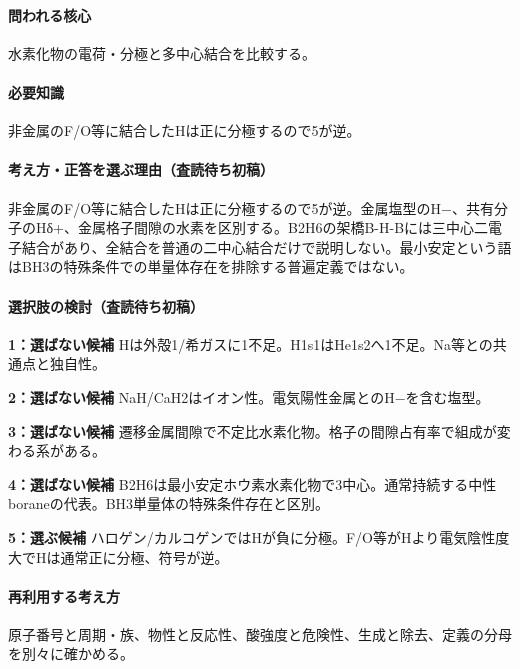\paragraph{問われる核心} 水素化物の電荷・分極と多中心結合を比較する。

\paragraph{必要知識} 非金属のF/O等に結合したHは正に分極するので5が逆。

\paragraph{考え方・正答を選ぶ理由（査読待ち初稿）} 非金属のF/O等に結合したHは正に分極するので5が逆。金属塩型のH−、共有分子のHδ+、金属格子間隙の水素を区別する。B2H6の架橋B-H-Bには三中心二電子結合があり、全結合を普通の二中心結合だけで説明しない。最小安定という語はBH3の特殊条件での単量体存在を排除する普遍定義ではない。

\paragraph{選択肢の検討（査読待ち初稿）}\mbox{}\par

\noindent\textbf{1：選ばない候補} Hは外殻1/希ガスに1不足。H1s1はHe1s2へ1不足。Na等との共通点と独自性。\par

\noindent\textbf{2：選ばない候補} NaH/CaH2はイオン性。電気陽性金属とのH−を含む塩型。\par

\noindent\textbf{3：選ばない候補} 遷移金属間隙で不定比水素化物。格子の間隙占有率で組成が変わる系がある。\par

\noindent\textbf{4：選ばない候補} B2H6は最小安定ホウ素水素化物で3中心。通常持続する中性boraneの代表。BH3単量体の特殊条件存在と区別。\par

\noindent\textbf{5：選ぶ候補} ハロゲン/カルコゲンではHが負に分極。F/O等がHより電気陰性度大でHは通常正に分極、符号が逆。\par

\paragraph{再利用する考え方} 原子番号と周期・族、物性と反応性、酸強度と危険性、生成と除去、定義の分母を別々に確かめる。

